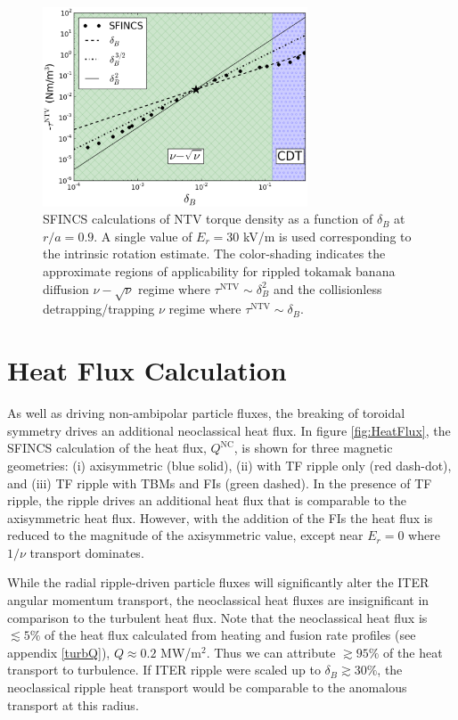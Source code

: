 \documentclass[aip, pop, preprint]{revtex4-1}
\begin{document}
\begin{figure}[h!]
\centering
\includegraphics[width=0.7\textwidth]{figure11.eps}
\caption{\label{fig:scalescan} SFINCS calculations of NTV torque density as a function of $\delta_B$ at $r/a = 0.9$. A single value of $E_r = 30$ kV/m is used corresponding to the intrinsic rotation estimate. The color-shading indicates the approximate regions of applicability for rippled tokamak banana diffusion $\nu-\sqrt{\nu}$ regime\cite{Shaing2008} where $\tau^{\mathrm{NTV}} \sim \delta_B^2$ and the collisionless detrapping/trapping $\nu$ regime\cite{Shaing2009} where $\tau^{\mathrm{NTV}} \sim \delta_B$.}
\end{figure} 

\FloatBarrier

\section{Heat Flux Calculation}\label{heatflux}
As well as driving non-ambipolar particle fluxes, the breaking of toroidal symmetry drives an additional neoclassical heat flux. In figure \ref{fig:HeatFlux}, the SFINCS calculation of the heat flux, $Q^{\mathrm{NC}}$, is shown for three magnetic geometries: (i) axisymmetric (blue solid), (ii) with TF ripple only (red dash-dot), and (iii) TF ripple with TBMs and FIs (green dashed). In the presence of TF ripple, the ripple drives an additional heat flux that is comparable to the axisymmetric heat flux. However, with the addition of the FIs the heat flux is reduced to the magnitude of the axisymmetric value, except near $E_r = 0$ where $1/\nu$ transport dominates. 

While the radial ripple-driven particle fluxes will significantly alter the ITER angular momentum transport, the neoclassical heat fluxes are insignificant in comparison to the turbulent heat flux. Note that the neoclassical heat flux is $\lesssim 5\%$  of the heat flux calculated from heating and fusion rate profiles (see appendix \ref{turbQ}), $Q\approx 0.2$ MW/m$^2$. Thus we can attribute $\gtrsim 95\%$ of the heat transport to turbulence. If ITER ripple were scaled up to $\delta_B \gtrsim 30\%$, the neoclassical ripple heat transport would be comparable to the anomalous transport at this radius.
\end{document}
